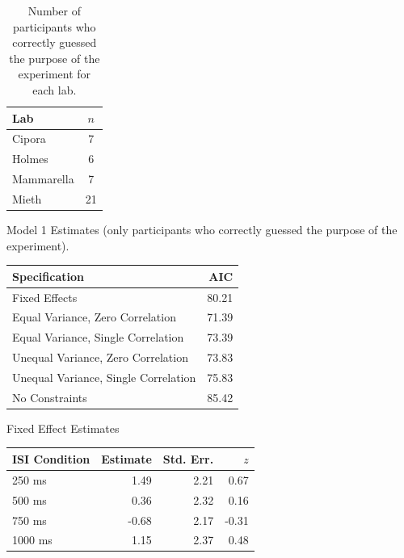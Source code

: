 \documentclass[man,floatsintext]{apa6}
\theoremstyle{definition}
\theoremstyle{definition}
\theoremstyle{definition}
\theoremstyle{remark}
\begin{document}
\begin{appendix}
\begin{table}

\caption{\label{tab:mod1bn}Number of participants who correctly guessed the purpose of the experiment for each lab.}
\centering
\begin{tabular}[t]{lc}
\toprule
Lab & $n$\\
\midrule
Cipora & 7\\
Holmes & 6\\
Mammarella & 7\\
Mieth & 21\\
\bottomrule
\end{tabular}
\end{table}

\begin{table}[!p]
\caption{\label{tab:mod1b}Model 1 Estimates (only participants who correctly guessed the purpose of the experiment).}
\begin{subtable}{\textwidth}
\centering
\begin{table}[H]\centering\begingroup\fontsize{10}{12}\selectfont

\begin{tabular}{lr}
\toprule
Specification & AIC\\
\midrule
Fixed Effects & 80.21\\
Equal Variance, Zero Correlation & 71.39\\
Equal Variance, Single Correlation & 73.39\\
Unequal Variance, Zero Correlation & 73.83\\
Unequal Variance, Single Correlation & 75.83\\
No Constraints & 85.42\\
\bottomrule
\end{tabular}\endgroup{}
\end{table}
\end{subtable}
\begin{subtable}{\textwidth}
\caption{Fixed Effect Estimates}
\centering
\begin{table}[H]\centering\begingroup\fontsize{10}{12}\selectfont

\begin{tabular}{lrrr}
\toprule
ISI Condition & Estimate & Std. Err. & $z$\\
\midrule
250  ms & 1.49 & 2.21 & 0.67\\
500  ms & 0.36 & 2.32 & 0.16\\
750  ms & -0.68 & 2.17 & -0.31\\
1000 ms & 1.15 & 2.37 & 0.48\\
\bottomrule
\end{tabular}\endgroup{}
\end{table}
\end{subtable}
\begin{subtable}{\textwidth}
\caption{Variance Component Estimates. Estimates are presented on the standard deviation scale. }
\centering
\begin{table}[H]\centering\begingroup\fontsize{10}{12}\selectfont


\end{table}
\end{subtable}
\end{table}
\end{appendix}
\end{document}

